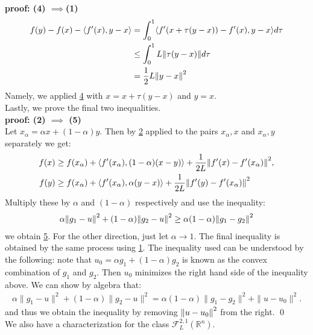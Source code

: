 \documentclass[12pt,a4paper]{article}
\begin{document}
	\textbf{proof: (4) $\implies $(1)}\\
	\begin{align*}
		f(y) - f(x) - \langle f'(x), y - x \rangle &= \int_{0}^{1}\langle f'(x + \tau(y - x)) - f'(x), y - x \rangle d\tau \\
		&\leq \int_{0}^{1} L \norm{\tau(y-x)}d\tau \\
		&= \frac{1}{2}L \norm{y - x}^2
	\end{align*}
	Namely, we applied \hyperref[thm215_4]{4} with $x = x + \tau(y-x)$ and $y = x$.\\
	Lastly, we prove the final two inequalities. \\
	\textbf{proof: (2) $\implies$ (5)}\\
	Let $x_\alpha = \alpha x + (1 - \alpha)y$. Then by \hyperref[thm215_2]{2} applied to the pairs $x_\alpha ,x$ and $x_\alpha ,y$ separately we get:
	\begin{align*}
		f(x) &\geq f(x_\alpha) + \langle f'(x_\alpha), (1-\alpha)(x - y) \rangle + \frac{1}{2L} \norm{f'(x) - f'(x_\alpha)}^2, \\
		f(y) &\geq f(x_\alpha) + \langle f'(x_\alpha), \alpha(y - x) \rangle + \frac{1}{2L}\norm{f'(y) - f'(x_\alpha)}^2
	\end{align*}
	Multiply these by $\alpha$ and $(1-\alpha)$ respectively and use the inequality:
	\begin{align*}
		\alpha \norm{g_1 - u}^2 + (1 - \alpha)\norm{g_2 - u}^2 \geq \alpha (1 - \alpha)\norm{g_1 - g_2}^2
	\end{align*}
	we obtain \hyperref[thm215_5]{5}. For the other direction, just let $\alpha \rightarrow 1$. The final inequality is obtained by the same process using \hyperref[thm215_1]{1}. The inequality used can be understood by the following: note that $u_0 = \alpha g_1 + (1 - \alpha)g_2$ is known as the convex combination of $g_1$ and $g_2$. Then $u_0$ minimizes the right hand side of the inequality above. We can show by algebra that:
	\begin{align*}
		\alpha \|g_1 - u\|^2 + (1-\alpha) \|g_2 - u\|^2 = \alpha(1-\alpha)\|g_1 - g_2\|^2 + \|u - u_0\|^2.
	\end{align*}
	and thus we obtain the inequality by removing $\norm{u - u_0}^2$ from the right. \qed \\
	We also have a characterization for the class $\mathcal{F}_L^{2,1}(\mathbb{R}^n)$. 
\end{document}
